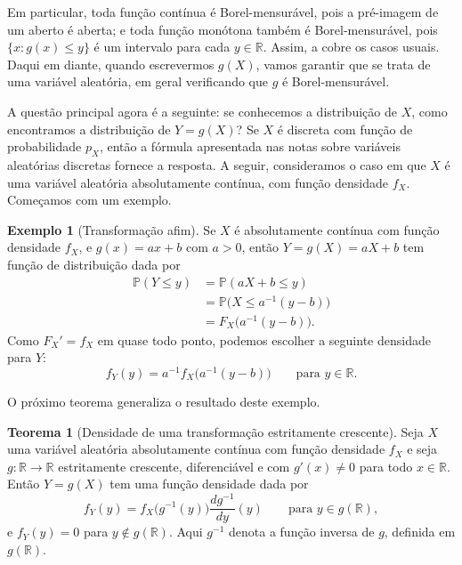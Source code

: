 \documentclass[12pt,portuguese]{article}
\theoremstyle{definition}
\newtheorem{theorem}{Teorema}
\newtheorem{example}[example]{Exemplo}
\theoremstyle{plainexercise}
\theoremstyle{starredexercise}
\theoremstyle{definition}
\begin{document}
Em particular, toda função contínua é Borel-mensurável, pois a pré-imagem de
um aberto é aberta; e toda função monótona também é Borel-mensurável, pois
$\{x : g(x) \leqslant y\}$ é um intervalo para cada $y \in \mathbb{R}$.
Assim, a  cobre os casos usuais. Daqui em
diante, quando escrevermos $g(X)$, vamos garantir que se trata de uma
variável aleatória, em geral verificando que $g$ é Borel-mensurável.

\medskip 

A questão principal agora é a
seguinte: se conhecemos a distribuição de $X$, como encontramos a
distribuição de $Y = g(X)$? Se $X$ é discreta com função de probabilidade
$p_X$, então a fórmula apresentada nas notas sobre variáveis aleatórias
discretas fornece a resposta. A seguir, consideramos o caso em que $X$ é
uma variável aleatória absolutamente contínua, com função densidade $f_X$. 
Começamos com um exemplo.

\begin{example}[Transformação afim]\label{ex:transformacao-afim}
  Se $X$ é absolutamente contínua com função densidade $f_X$, e $g(x) = ax + b$ com
  $a > 0$, então $Y = g(X) = aX + b$ tem função de distribuição dada por
  \[
    \begin{aligned}
      \mathbb{P}(Y \leqslant y) &= \mathbb{P}(aX + b \leqslant y) \\
      &= \mathbb{P}\bigl(X \leqslant a^{-1}(y - b)\bigr) \\
      &= F_X\bigl(a^{-1}(y - b)\bigr).
    \end{aligned}
  \]
  Como $F_X'=f_X$ em quase todo ponto, podemos escolher a seguinte
  densidade para $Y$:
  \[
    f_Y(y) = a^{-1} f_X\bigl(a^{-1}(y - b)\bigr) \qquad \text{para } y \in
    \mathbb{R}.
  \]
\end{example}

O próximo teorema generaliza o resultado deste exemplo.

\begin{theorem}[Densidade de uma transformação estritamente crescente]\label{thm:transformacao-crescente}
  Seja $X$ uma variável aleatória absolutamente contínua com função densidade $f_X$ e seja
  $g : \mathbb{R} \to \mathbb{R}$ estritamente crescente, diferenciável e com
  $g'(x) \neq 0$ para todo $x \in \mathbb{R}$. Então $Y = g(X)$ tem uma função
  densidade dada por
  \begin{equation}\label{eq:transformacao-crescente}
    f_Y(y) = f_X\bigl(g^{-1}(y)\bigr) \frac{dg^{-1}}{dy}(y)
    \qquad \text{para } y \in g(\mathbb{R}),
  \end{equation}
  e $f_Y(y) = 0$ para $y \notin g(\mathbb{R})$. Aqui $g^{-1}$ denota a função
  inversa de $g$, definida em $g(\mathbb{R})$.
\end{theorem}
\end{document}
